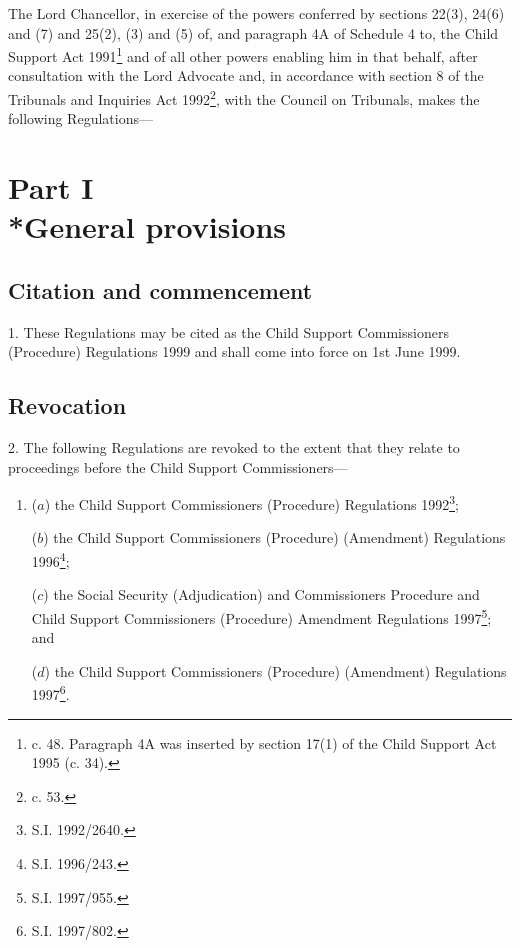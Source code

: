 \documentclass[12pt,a4paper]{article}
\title{\regstitle}
\author{S.I. 1999 No. 1047}
\date{Made 4th May 1999\\Laid before Parliament 7th May 1999\\Coming into force 1st June 1999}
\begin{document}
\maketitle

\noindent
The Lord Chancellor, in exercise of the powers conferred by sections 22(3), 24(6) and (7) and 25(2), (3) and (5) of, and paragraph 4A of Schedule 4 to, the Child Support Act 1991\footnote{ c. 48. Paragraph 4A was inserted by section 17(1) of the Child Support Act 1995 (c. 34).} and of all other powers enabling him in that behalf, after consultation with the Lord Advocate and, in accordance with section 8 of the Tribunals and Inquiries Act 1992\footnote{ c. 53.}, with the Council on Tribunals, makes the following Regulations---

{\sloppy

\tableofcontents

}

\bigskip

\setcounter{secnumdepth}{-2}

\section[Part I --- General provisions]{Part I\\*General provisions}

\renewcommand\parthead{--- Part I}

\subsection[1. Citation and commencement]{Citation and commencement}

1.  These Regulations may be cited as the Child Support Commissioners (Procedure) Regulations 1999 and shall come into force on 1st June 1999.

\subsection[2. Revocation]{Revocation}

2.  The following Regulations are revoked to the extent that they relate to proceedings before the Child Support Commissioners---
\begin{enumerate}\item[]
($a$) the Child Support Commissioners (Procedure) Regulations 1992\footnote{\frenchspacing S.I. 1992/2640.};

($b$) the Child Support Commissioners (Procedure) (Amendment) Regulations 1996\footnote{\frenchspacing S.I. 1996/243.};

($c$) the Social Security (Adjudication) and Commissioners Procedure and Child Support Commissioners (Procedure) Amendment Regulations 1997\footnote{\frenchspacing S.I. 1997/955.}; and

($d$) the Child Support Commissioners (Procedure) (Amendment) Regulations 1997\footnote{\frenchspacing S.I. 1997/802.}.
\end{enumerate}
\end{document}
